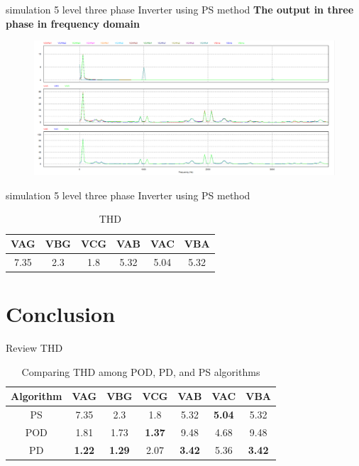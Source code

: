 \documentclass[
	11pt, %
]{beamer}
\begin{document}
\begin{frame}{simulation 5 level three phase Inverter using PS method}
	\scriptsize{\textbf{The output in three phase in frequency domain}}
	\begin{figure}
        \includegraphics[width=1\linewidth]{Sim_PS_FFT.png}
    \end{figure}
\end{frame}

\begin{frame}{simulation 5 level three phase Inverter using PS method}
	\begin{table}[htbp]
		\centering
		\caption{THD}
		\label{tab:example}
		\begin{tabular}{|c|c|c|c|c|c|}
			\hline
			VAG & VBG & VCG & VAB & VAC & VBA \\
			\hline
			7.35 & 2.3 & 1.8 & 5.32 & 5.04 &  5.32 \\
			\hline
		\end{tabular}
	\end{table}
\end{frame}






\section{Conclusion}
\begin{frame}{Review THD}
	\begin{table}[htbp]
		\centering
		\caption{Comparing THD among POD, PD, and PS algorithms}
		\label{tab:example}
		\begin{tabular}{|c|c|c|c|c|c|c|}
			\hline
			 Algorithm & VAG & VBG & VCG & VAB & VAC & VBA \\
			\hline
			 PS & 7.35 & 2.3 & 1.8 & 5.32 & \textbf{5.04} &  5.32 \\
			\hline
			 POD & 1.81 & 1.73 & \textbf{1.37} & 9.48 & 4.68 & 9.48 \\
			 \hline
			 PD & \textbf{1.22} & \textbf{1.29} & 2.07 & \textbf{3.42} & 5.36 & \textbf{3.42} \\
			 \hline
		\end{tabular}
	\end{table}
\end{frame}
\end{document}
